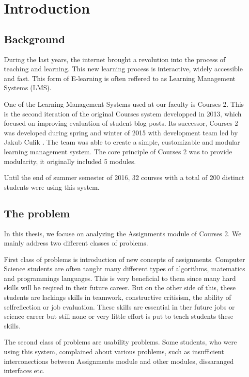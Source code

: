 \chapter*{Introduction}

\section*{Background}
During the last years, the internet brought a revolution into the process of teaching and learning. This new learning process is interactive, widely accessible and fast. This form of E-learning is often reffered to as Learning Management Systems (LMS).

One of the Learning Management Systems used at our faculty is Courses 2. This is the second iteration of the original Courses system developped in 2013, which focused on improving evaluation of student blog posts.  Its successor, Courses 2  was developed during spring and winter of 2015 with development team led by Jakub Culik \cite{culik}. The team was able to create a simple, customizable and modular learning management system. The core principle of Courses 2 was to provide modularity, it originally included 5 modules. 

Until the end of summer semester of 2016, 32 courses with a total of 200 distinct students were using this system.

\section*{The problem}
In this thesis, we focuse on analyzing the Assignments module of Courses 2. We mainly address two different classes of problems.

First class of problems is introduction of new concepts of assignments. Computer Science students are often taught many different types of algorithms, matematics and programmings languages. This is very beneficial to them since many hard skills will be reqired in their future career. But on the other side of this, these students are lackings skills in teamwork, constructive critisism, the ability of self\-reflection or job evaluation.  These skills are essential in ther future jobs or science career but still none or very little effort is put to teach students these skills.

The second class of problems are usability problems. Some students, who were using this system, complained about various problems, such as insufficient interconections between Assignments module and other modules, dissaranged interfaces etc.

